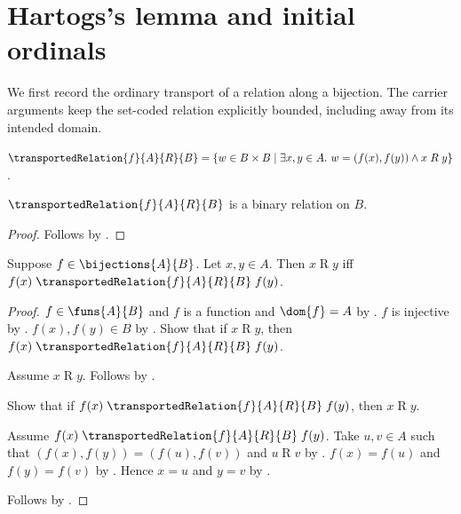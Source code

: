 


\section{Hartogs's lemma and initial ordinals}

We first record the ordinary transport of a relation along a bijection.  The
carrier arguments keep the set-coded relation explicitly bounded, including
away from its intended domain.

\begin{definition}\label{transported_relation}
    $\transportedRelation{f}{A}{R}{B}
        =\{w\in B\times B\mid
            \exists x,y\in A.\ w=(f(x),f(y))\land x\mathrel{R}y\}$.
\end{definition}

\begin{proposition}\label{transported_relation_binary_on}
    $\transportedRelation{f}{A}{R}{B}$ is a binary relation on $B$.
\end{proposition}
\begin{proof}
    Follows by .
\end{proof}

\begin{proposition}\label{transported_relation_iff}
    Suppose $f\in\bijections{A}{B}$.
    Let $x,y\in A$.
    Then $x\mathrel{R}y$ iff
        $f(x)\mathrel{\transportedRelation{f}{A}{R}{B}}f(y)$.
\end{proposition}
\begin{proof}
    $f\in\funs{A}{B}$ and $f$ is a function and $\dom{f}=A$
        by .
    $f$ is injective by .
    $f(x),f(y)\in B$ by .
    Show that if $x\mathrel{R}y$, then
        $f(x)\mathrel{\transportedRelation{f}{A}{R}{B}}f(y)$.
    \begin{subproof}
        Assume $x\mathrel{R}y$.
        Follows by
            .
    \end{subproof}
    Show that if
        $f(x)\mathrel{\transportedRelation{f}{A}{R}{B}}f(y)$,
        then $x\mathrel{R}y$.
    \begin{subproof}
        Assume
            $f(x)\mathrel{\transportedRelation{f}{A}{R}{B}}f(y)$.
        Take $u,v\in A$ such that
            $(f(x),f(y))=(f(u),f(v))$ and $u\mathrel{R}v$
            by .
        $f(x)=f(u)$ and $f(y)=f(v)$ by .
        Hence $x=u$ and $y=v$ by .
    \end{subproof}
    Follows by \auto.
\end{proof}

